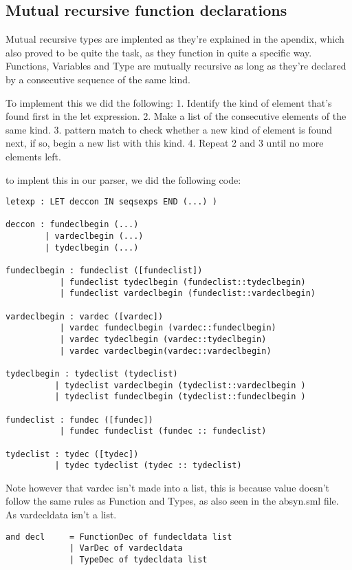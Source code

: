 \documentclass{article}
\begin{document}
\subsection{Mutual recursive function declarations}
Mutual recursive types are implented as they're explained in the apendix, which also proved to be quite the task, as they function in quite a specific way.
Functions, Variables and Type are mutually recursive as long as they're declared by a consecutive sequence of the same kind. 

To implement this we did the following:
1. Identify the kind of element that's found first in the let expression.
2. Make a list of the consecutive elements of the same kind.
3. pattern match to check whether a new kind of element is found next, if so, begin a new list with this kind.
4. Repeat 2 and 3 until no more elements left.

to implent this in our parser, we did the following code:
\begin{lstlisting}[frame=single]
letexp : LET deccon IN seqsexps END (...) )

deccon : fundeclbegin (...)
        | vardeclbegin (...)
        | tydeclbegin (...)

fundeclbegin : fundeclist ([fundeclist])
           | fundeclist tydeclbegin (fundeclist::tydeclbegin)
           | fundeclist vardeclbegin (fundeclist::vardeclbegin)

vardeclbegin : vardec ([vardec])
           | vardec fundeclbegin (vardec::fundeclbegin)
           | vardec tydeclbegin (vardec::tydeclbegin)
           | vardec vardeclbegin(vardec::vardeclbegin)

tydeclbegin : tydeclist (tydeclist)
          | tydeclist vardeclbegin (tydeclist::vardeclbegin )
          | tydeclist fundeclbegin (tydeclist::fundeclbegin )

fundeclist : fundec ([fundec])
           | fundec fundeclist (fundec :: fundeclist)

tydeclist : tydec ([tydec])
          | tydec tydeclist (tydec :: tydeclist)

\end{lstlisting}
Note however that vardec isn't made into a list, this is because value doesn't follow the same rules as Function and Types, as also seen in the absyn.sml file. As vardecldata isn't a list.

\begin{lstlisting}[frame=single]
and decl     = FunctionDec of fundecldata list
             | VarDec of vardecldata
             | TypeDec of tydecldata list
\end{lstlisting}
\end{document}
